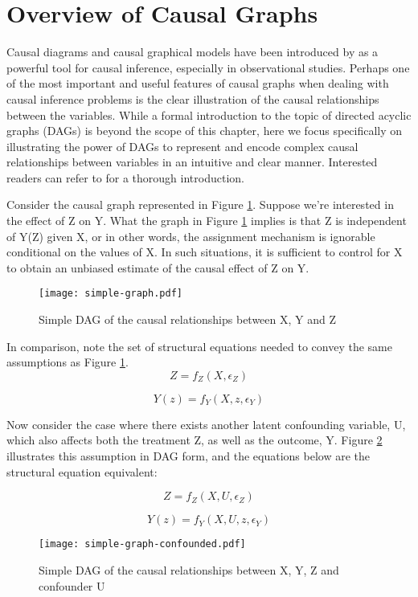 \section{Overview of Causal Graphs}

Causal diagrams and causal graphical models have been introduced by \citet{pearl_causality_2000} as a powerful tool for causal inference, especially in observational studies. 
Perhaps one of the most important and useful features of causal 
graphs when dealing with causal inference problems is the clear illustration 
of the causal relationships between the variables. 
While a formal introduction to the topic of directed acyclic graphs (DAGs) is beyond the scope of this chapter, 
here we focus specifically on illustrating the power of DAGs to represent 
and encode complex  causal relationships between variables in an intuitive and 
clear manner. 
Interested readers can refer to \citet{pearl_causality_2000} for a thorough introduction. 

Consider the causal graph represented in Figure \ref{fig:simple-graph}. 
Suppose we're interested in the effect of Z on Y. 
What the graph in Figure \ref{fig:simple-graph} implies is that Z is 
independent of Y(Z) given X, or in other words, the assignment mechanism is 
ignorable conditional on the values of X. 
In such situations, it is sufficient to control for 
X to obtain an unbiased estimate of the causal effect of Z on Y. 

\begin{figure}[h!]
   \centering
   \texttt{[image: simple-graph.pdf]}
   \caption{Simple DAG of the causal relationships between X, Y and Z}
   \label{fig:simple-graph}
\end{figure}

In comparison, note the set of structural equations needed to convey the same assumptions as Figure \ref{fig:simple-graph}. 
\[Z = f_Z(X, \epsilon_Z)  \]

\[Y(z) = f_Y(X, z, \epsilon_Y)  \]

Now consider the case where there exists another latent confounding variable, U, which also affects both the treatment Z, as well as the outcome, Y. 
Figure \ref{fig:simple-graph-confounded} illustrates this assumption in DAG form, and the equations below are the structural equation equivalent:

\[Z = f_Z(X, U, \epsilon_Z)  \]

\[Y(z) = f_Y(X, U, z, \epsilon_Y)  \]

\begin{figure}[h!]
   \centering
   \texttt{[image: simple-graph-confounded.pdf]}
   \caption{Simple DAG of the causal relationships between X, Y, Z and confounder U}
   \label{fig:simple-graph-confounded}
\end{figure}

